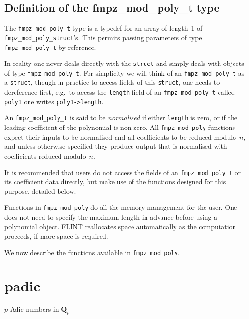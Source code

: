 \documentclass[a4paper,10pt]{book}
\newcommand{\code}{\lstinline}
\begin{document}
\section{Definition of the fmpz\_mod\_poly\_t type}

The \code{fmpz_mod_poly_t} type is a typedef for an array of length~1 of 
\code{fmpz_mod_poly_struct}'s.  This permits passing parameters of type 
\code{fmpz_mod_poly_t} by reference. 

In reality one never deals directly with the \code{struct} and simply deals 
with objects of type \code{fmpz_mod_poly_t}.  For simplicity we will think of an 
\code{fmpz_mod_poly_t} as a \code{struct}, though in practice to access fields 
of this \code{struct}, one needs to dereference first, e.g.\ to access the 
\code{length} field of an \code{fmpz_mod_poly_t} called \code{poly1} one writes 
\code{poly1->length}. 

An \code{fmpz_mod_poly_t} is said to be \emph{normalised} if either 
\code{length} is zero, or if the leading coefficient of the polynomial is 
non-zero.  All \code{fmpz_mod_poly} functions expect their inputs to be 
normalised and all coefficients to be reduced modulo~$n$, and unless 
otherwise specified they produce output that is normalised with coefficients 
reduced modulo~$n$.

It is recommended that users do not access the fields of an 
\code{fmpz_mod_poly_t} or its coefficient data directly, but make use of the 
functions designed for this purpose, detailed below.

Functions in \code{fmpz_mod_poly} do all the memory management for the user. 
One does not need to specify the maximum length in advance before using a 
polynomial object.  FLINT reallocates space automatically as the computation 
proceeds, if more space is required. 

We now describe the functions available in \code{fmpz_mod_poly}.




\chapter{padic}
\epigraph{$p$-Adic numbers in $\mathbf{Q}_p$}{}
\end{document}
